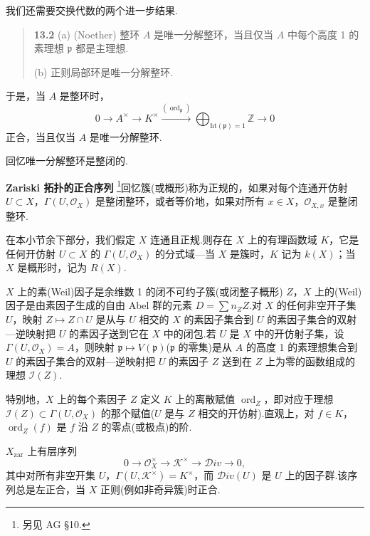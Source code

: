 我们还需要交换代数的两个进一步结果.

\begin{quote}
\label{item:13.2}
\textbf{13.2} (a) (Noether) 整环 $A$ 是唯一分解整环，当且仅当 $A$ 中每个高度 1 的素理想 $\mathfrak{p}$ 都是主理想.

(b) 正则局部环是唯一分解整环.
\end{quote}

于是，当 $A$ 是整环时，
\[
0 \to A^{\times} \to K^{\times} \xrightarrow{(\operatorname{ord}_{\mathfrak{p}})} \bigoplus_{\mathrm{ht}(\mathfrak{p}) = 1} \mathbb{Z} \to 0
\]
正合，当且仅当 $A$ 是唯一分解整环.

回忆唯一分解整环是整闭的.

\textbf{Zariski 拓扑的正合序列} \footnote{另见 AG \S 10.}回忆簇(或概形)称为正规的，如果对每个连通开仿射 $U \subset X$，$\Gamma(U, \mathcal{O}_X)$ 是整闭整环，或者等价地，如果对所有 $x \in X$，$\mathcal{O}_{X, x}$ 是整闭整环.

在本小节余下部分，我们假定 $X$ 连通且正规.则存在 $X$ 上的有理函数域 $K$，它是任何开仿射 $U \subset X$ 的 $\Gamma(U, \mathcal{O}_X)$ 的分式域---当 $X$ 是簇时，$K$ 记为 $k(X)$；当 $X$ 是概形时，记为 $R(X)$.

$X$ 上的素(Weil)因子是余维数 1 的闭不可约子簇(或闭整子概形) $Z$，$X$ 上的(Weil)因子是由素因子生成的自由 Abel 群的元素 $D = \sum n_Z Z$.对 $X$ 的任何非空开子集 $U$，映射 $Z \mapsto Z \cap U$ 是从与 $U$ 相交的 $X$ 的素因子集合到 $U$ 的素因子集合的双射---逆映射把 $U$ 的素因子送到它在 $X$ 中的闭包.若 $U$ 是 $X$ 中的开仿射子集，设 $\Gamma(U, \mathcal{O}_X) = A$，则映射 $\mathfrak{p} \mapsto V(\mathfrak{p})$($\mathfrak{p}$ 的零集)是从 $A$ 的高度 1 的素理想集合到 $U$ 的素因子集合的双射---逆映射把 $U$ 的素因子 $Z$ 送到在 $Z$ 上为零的函数组成的理想 $\mathcal{I}(Z)$.

特别地，$X$ 上的每个素因子 $Z$ 定义 $K$ 上的离散赋值 $\operatorname{ord}_{Z}$，即对应于理想 $\mathcal{I}(Z) \subset \Gamma(U, \mathcal{O}_X)$ 的那个赋值($U$ 是与 $Z$ 相交的开仿射).直观上，对 $f \in K$，$\operatorname{ord}_Z(f)$ 是 $f$ 沿 $Z$ 的零点(或极点)的阶.

\begin{proposition}\label{prop:13.3}
$X_{\mathrm{zar}}$ 上有层序列
\[
0 \to \mathcal{O}^{\times}_{X} \to \mathcal{K}^{\times} \to \mathcal{D}iv \to 0,
\]
其中对所有非空开集 $U$，$\Gamma(U, \mathcal{K}^{\times}) = K^{\times}$，而 $\mathcal{D}iv(U)$ 是 $U$ 上的因子群.该序列总是左正合，当 $X$ 正则(例如非奇异簇)时正合.
\end{proposition}

